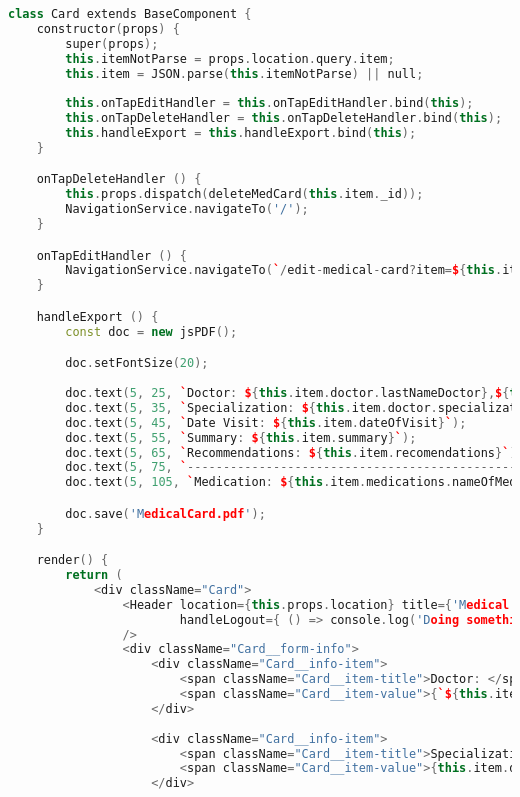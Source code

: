 \begin{lstlisting}[language=C++, style=cplusplusstyle]
class Card extends BaseComponent {
    constructor(props) {
        super(props);
        this.itemNotParse = props.location.query.item;
        this.item = JSON.parse(this.itemNotParse) || null;
        
        this.onTapEditHandler = this.onTapEditHandler.bind(this);
        this.onTapDeleteHandler = this.onTapDeleteHandler.bind(this);
        this.handleExport = this.handleExport.bind(this);
    }

    onTapDeleteHandler () {
        this.props.dispatch(deleteMedCard(this.item._id));
        NavigationService.navigateTo('/');
    }

    onTapEditHandler () {
        NavigationService.navigateTo(`/edit-medical-card?item=${this.itemNotParse}`);
    }

    handleExport () {
        const doc = new jsPDF();

        doc.setFontSize(20);
        
        doc.text(5, 25, `Doctor: ${this.item.doctor.lastNameDoctor},${this.item.doctor.firstNameDoctor.charAt(0)}.${this.item.doctor.familyNameDoctor.charAt(0)}.`);
        doc.text(5, 35, `Specialization: ${this.item.doctor.specialization}`);
        doc.text(5, 45, `Date Visit: ${this.item.dateOfVisit}`);
        doc.text(5, 55, `Summary: ${this.item.summary}`);
        doc.text(5, 65, `Recommendations: ${this.item.recomendations}`);
        doc.text(5, 75, `-----------------------------------------------------`);
        doc.text(5, 105, `Medication: ${this.item.medications.nameOfMedication}, step: ${this.item.medications.stepTreatment}, quantity: ${this.item.medications.quantity}, count days: ${this.item.medications.countDays}.`);

        doc.save('MedicalCard.pdf');
    }

    render() {
        return (
            <div className="Card">
                <Header location={this.props.location} title={'Medical Card Info'} isMainPage={false}
                        handleLogout={ () => console.log('Doing something') }
                />
                <div className="Card__form-info">
                    <div className="Card__info-item">
                        <span className="Card__item-title">Doctor: </span>
                        <span className="Card__item-value">{`${this.item.doctor.lastNameDoctor},${this.item.doctor.firstNameDoctor.charAt(0)}.${this.item.doctor.familyNameDoctor.charAt(0)}.`}</span>
                    </div>
                    
                    <div className="Card__info-item">
                        <span className="Card__item-title">Specialization: </span>
                        <span className="Card__item-value">{this.item.doctor.specialization}</span>
                    </div>


\end{lstlisting}

